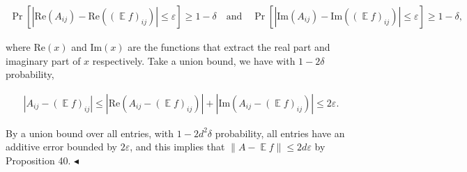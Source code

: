 \[\begin{gathered}
\Pr\left[\left|\mathrm{Re}(A_{ij})-\mathrm{Re}((\operatorname*{\mathbb{E}}f)_{ij})\right|\leq\varepsilon\right]\geq 1-\delta\quad\text{and}\quad\Pr\left[\left|\mathrm{Im}(A_{ij})-\mathrm{Im}((\operatorname*{\mathbb{E}}f)_{ij})\right|\leq\varepsilon\right]\geq 1-\delta,
\end{gathered}\]


where $\mathrm{Re}(x)$ and $\mathrm{Im}(x)$ are the functions that extract the real part and imaginary part of $x$ respectively. Take a union bound, we have with $1-2\delta$ probability,\par


\[\begin{gathered}
\left|A_{ij}-(\operatorname*{\mathbb{E}}f)_{ij}\right|\leq\left|\mathrm{Re}(A_{ij}-(\operatorname*{\mathbb{E}}f)_{ij})\right|+\left|\mathrm{Im}(A_{ij}-(\operatorname*{\mathbb{E}}f)_{ij})\right|\leq 2\varepsilon.
\end{gathered}\]


By a union bound over all entries, with $1-2d^{2}\delta$ probability, all entries have an additive error bounded by $2\varepsilon$, and this implies that $\|A-\operatorname*{\mathbb{E}}f\|\leq 2d\varepsilon$ by Proposition 40.
$\blacktriangleleft$
\par



